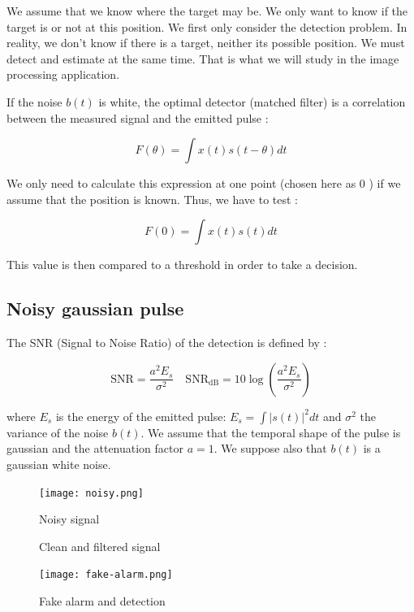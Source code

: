 We assume that we know where the target may be. We only want to know if the target is or not at this position. We first only consider the detection problem. In reality, we don't know if there is a target, neither its possible position. We must detect and estimate at the same time. That is what we will study in the image processing application.

If the noise $b(t)$ is white, the optimal detector (matched filter) is a correlation between the measured signal and the emitted pulse :

$$
F(\theta)=\int x(t) s(t-\theta) d t
$$

We only need to calculate this expression at one point (chosen here as 0 ) if we assume that the position is known. Thus, we have to test :

$$
F(0)=\int x(t) s(t) d t
$$

This value is then compared to a threshold in order to take a decision.

\pagebreak
\subsection{Noisy gaussian pulse}
The SNR (Signal to Noise Ratio) of the detection is defined by :

$$
\mathrm{SNR}=\frac{a^{2} E_{s}}{\sigma^{2}} \quad \mathrm{SNR}_{\mathrm{dB}}=10 \log \left(\frac{a^{2} E_{s}}{\sigma^{2}}\right)
$$

where $E_{s}$ is the energy of the emitted pulse: $E_{s}=\int|s(t)|^{2} d t$ and $\sigma^{2}$ the variance of the noise $b(t)$. We assume that the temporal shape of the pulse is gaussian and the attenuation factor $a=1$. We suppose also that $b(t)$ is a gaussian white noise.

\begin{figure}[h]
	\centering
	\texttt{[image: noisy.png]}
	\caption{Noisy signal}
	\label{fig:noisy}
\end{figure}

\begin{figure}[h]
    \centering
	\caption{Clean and filtered signal}
\end{figure}

\begin{figure}[h]
	\centering
	\texttt{[image: fake-alarm.png]}
	\caption{Fake alarm and detection}
	\label{fig:fake-detection}
\end{figure}

